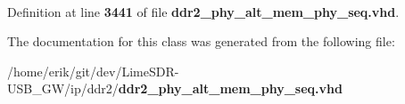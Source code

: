 \paragraph[{t\+\_\+base\+\_\+hdr\+\_\+addresses}]{ {\bfseries \textcolor{vhdlchar}{ }} \hspace{0.3cm}{\ttfamily [Record]}}\label{classddr2__phy__alt__mem__phy__iram__addr__pkg_a7e4c2660df3211f4ef5d508103cc5534}


Definition at line {\bf 3441} of file {\bf ddr2\+\_\+phy\+\_\+alt\+\_\+mem\+\_\+phy\+\_\+seq.\+vhd}.



The documentation for this class was generated from the following file\+:\begin{DoxyCompactItemize}
\item 
/home/erik/git/dev/\+Lime\+S\+D\+R-\/\+U\+S\+B\+\_\+\+G\+W/ip/ddr2/{\bf ddr2\+\_\+phy\+\_\+alt\+\_\+mem\+\_\+phy\+\_\+seq.\+vhd}\end{DoxyCompactItemize}
